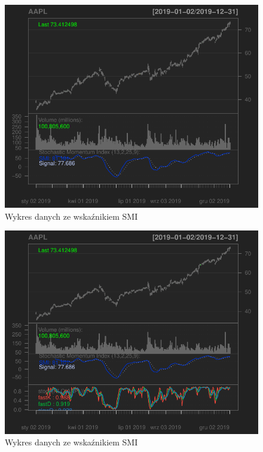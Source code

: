 \documentclass[12pt, a4paper]{article}\usepackage[]{graphicx}\usepackage[]{color}
\makeatletter
\def\maxwidth{ %
  \ifdim\Gin@nat@width>\linewidth
    \linewidth
  \else
    \Gin@nat@width
  \fi
}
\newenvironment{knitrout}{}{} %
\makeatother
\begin{document}
\begin{knitrout}
\begin{figure}[H]
{\centering \includegraphics[width=\maxwidth]{figure/unnamed-chunk-4-2} 

}

\caption[Wykres danych ze wskaźnikiem SMI]{Wykres danych ze wskaźnikiem SMI}\label{fig:unnamed-chunk-4-2}
\end{figure}

\begin{figure}[H]

{\centering \includegraphics[width=\maxwidth]{figure/unnamed-chunk-4-3} 

}

\caption[Wykres danych ze wskaźnikiem SMI]{Wykres danych ze wskaźnikiem SMI}\label{fig:unnamed-chunk-4-3}
\end{figure}

\end{knitrout}
\end{document}
